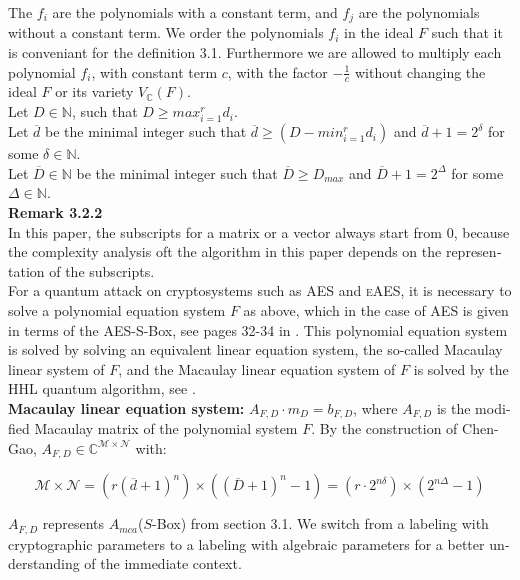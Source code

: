 \documentclass[a4paper,11pt]{article}
\begin{document}
\begin{otherlanguage}{english}
\noindent
The $f_i$ are the polynomials with a constant term, and $f_j$ are the polynomials without a constant term. We order the polynomials $f_i$ in the ideal $F$ such that it is conveniant for the definition 3.1. Furthermore we are allowed to multiply each polynomial $f_i$, with constant term $c$, with the factor $-\frac{1}{c}$ without changing the ideal $F$ or its variety $V_\mathbb{C}(F)$.\\


\noindent
Let $D \in \mathbb{N}$, such that $D \geq max_{i=1}^r d_i$. \\
Let $\overline{d}$ be the minimal integer such that $\overline{d} \geq (D - min_{i=1}^r d_i)$ and $\overline{d}+1= 2^\delta$ for some $\delta \in \mathbb{N}$. \\
Let $\overline{D} \in \mathbb{N}$ be the minimal integer such that $\overline{D} \geq D_{max}$ and $\overline{D}+1 = 2^\Delta$ for some $\Delta \in \mathbb{N}$. \\ 

\noindent
\textbf{Remark 3.2.2} \\
In this paper, the subscripts for a matrix or a vector always start from 0, because the complexity analysis oft the algorithm in this paper depends on the representation of the subscripts. \\

\noindent
For a quantum attack on cryptosystems such as \textsc{AES} and \textsc{eAES}, it is necessary to solve a polynomial equation system $F$ as above, which in the case of \textsc{AES} is given in terms of the \textsc{AES}-S-Box, see pages 32-34 in \cite{QAA}. This polynomial equation system is solved by solving an equivalent linear equation system, the so-called Macaulay linear system \cite{MCA} of $F$, and the Macaulay linear equation system of $F$ is solved by the \textsc{HHL} quantum algorithm, see \cite{HHL}.\\

\noindent
\textbf{Macaulay linear equation system:} $A_{F,D} \cdot m_D = b_{F,D}$,
where $A_{F,D}$ is the modified Macaulay matrix of the polynomial system $F$. By the construction of Chen-Gao, $A_{F,D} \in \mathbb{C}^{\mathcal{M} \times \mathcal{N}}$ with:

$$\mathcal{M} \times \mathcal{N} = ( r (\overline{d}+1)^n ) \times ((\overline{D} + 1 )^n -1) 
= (r \cdot 2^{n \delta}) \times (2^{n \Delta} -1 )$$

\noindent
$A_{F,D}$ represents $A_{mca}$($S$-Box) from section 3.1. We switch from a labeling with cryptographic parameters to a labeling with algebraic parameters for a better understanding of the immediate context.\\


\end{otherlanguage}
\end{document}
